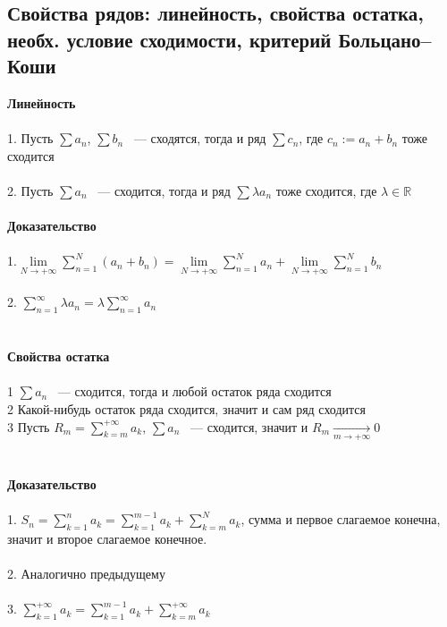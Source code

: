 \documentclass[../main.tex]{subfiles}
\begin{document}
\newpage


\subsection{Свойства рядов: линейность, свойства остатка, необх. условие сходимости, критерий Больцано--Коши} 
\textbf{Линейность}\\\\
1. Пусть $\sum a_n$, $\sum b_n$ ~--- сходятся, тогда и ряд $\sum c_n$, где $c_n := a_n + b_n$ тоже сходится \\\\
2. Пусть $\sum a_n$ ~--- сходится, тогда и ряд $\sum \lambda a_n$ тоже сходится, где $\lambda \in \mathbb{R}$ \\\\
\textbf{Доказательство} \\\\
1.$\lim\limits_{N \rightarrow +\infty} \sum\limits^N_{n = 1} (a_n + b_n) = \lim\limits_{N \rightarrow +\infty} \sum\limits^N_{n = 1} a_n + \lim\limits_{N \rightarrow +\infty} \sum\limits^N_{n = 1} b_n$ \\\\       
2. $\sum\limits^{\infty}_{n = 1} \lambda a_n = \lambda \sum\limits^{\infty}_{n = 1} a_n$\\\\\\
\textbf{Свойства остатка}\\\\
1 $\sum a_n$ ~--- сходится, тогда и любой остаток ряда сходится \\
2 Какой-нибудь остаток ряда сходится, значит и сам ряд сходится \\
3 Пусть $R_m = \sum\limits_{k = m}^{+\infty} a_k$, $\sum a_n$ ~--- сходится, значит и $R_m \xrightarrow[m \rightarrow +\infty]{} 0$ \\\\\\
\textbf{Доказательство} \\\\
1. $S_n = \sum\limits^n_{k = 1} a_k = \sum\limits^{m - 1}_{k = 1} a_k + \sum\limits_{k = m}^N a_k$, сумма и первое слагаемое конечна, значит и второе слагаемое конечное. \\\\
2. Аналогично предыдущему \\\\
3. $\sum\limits^{+\infty}_{k = 1} a_k = \sum\limits^{m - 1}_{k = 1} a_k + \sum\limits^{+\infty}_{k = m} a_k$ \\\\\\
\end{document}
